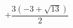 \documentclass[preview]{standalone}
\begin{document}
\begin{align*}
+ \dfrac{ 3(-3 + \sqrt{13}) }{2}
\end{align*}
\end{document}
